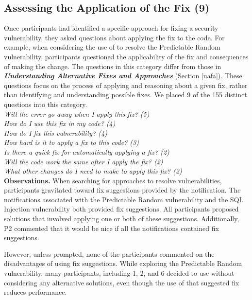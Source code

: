 \documentclass[conference]{IEEEtran}
\begin{document}

\noindent\subsection{\textbf{Assessing the Application of the Fix (9)}}\label{aaf}
Once participants had identified a specific approach for fixing a security vulnerability, they asked questions about applying the fix to the code.
For example, when considering the use of  to resolve the Predictable Random vulnerability, participants questioned the applicability of the fix and consequences of making the change. 
The questions in this category differ from those in \emph{\textbf{Understanding Alternative Fixes and Approaches}} (Section \ref{uafa}). 
These questions focus on the process of applying  and reasoning about a given fix, rather than identifying and understanding possible fixes.
We placed 9 of the 155 distinct questions into this category.
\\

\noindent\emph{Will the error go away when I apply this fix? (5)} \\
\emph{How do I use this fix in my code? (4)} \\
\emph{How do I fix this vulnerability? (4)} \\
\emph{How hard is it to apply a fix to this code? (3)} \\
\emph{Is there a quick fix for automatically applying a fix? (2)} \\
\emph{Will the code work the same after I apply the fix? (2)} \\
\emph{What other changes do I need to make to apply this fix? (2)} \\


\noindent\textbf{Observations.}
When searching for approaches to resolve vulnerabilities, participants gravitated toward fix suggestions provided by the notification.
The notifications associated with the Predictable Random vulnerability and the SQL Injection vulnerability both provided fix suggestions.
All participants proposed solutions that involved applying one or both of these suggestions. 
Additionally, P2 commented that it would be nice if all the notifications contained fix suggestions.

However, unless prompted, none of the participants commented on the disadvantages of using fix suggestions.
While exploring the Predictable Random vulnerability, many participants, including 1, 2, and 6 decided to use  without considering any alternative solutions, even though the use of that suggested fix reduces performance.
\\
\end{document}
